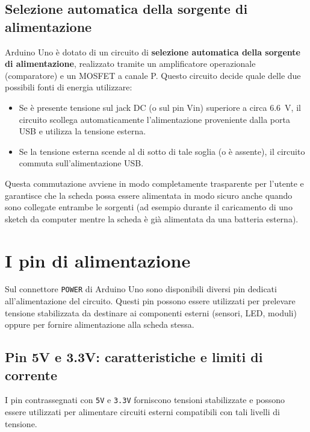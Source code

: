 \subsection*{Selezione automatica della sorgente di alimentazione}

Arduino Uno è dotato di un circuito di \textbf{selezione automatica della sorgente di alimentazione}, realizzato tramite un amplificatore operazionale (comparatore) e un MOSFET a canale P. Questo circuito decide quale delle due possibili fonti di energia utilizzare:

\begin{itemize}
    \item Se è presente tensione sul jack DC (o sul pin Vin) superiore a circa \SI{6.6}{\volt}, il circuito scollega automaticamente l'alimentazione proveniente dalla porta USB e utilizza la tensione esterna.
    \item Se la tensione esterna scende al di sotto di tale soglia (o è assente), il circuito commuta sull'alimentazione USB.
\end{itemize}

Questa commutazione avviene in modo completamente trasparente per l'utente e garantisce che la scheda possa essere alimentata in modo sicuro anche quando sono collegate entrambe le sorgenti (ad esempio durante il caricamento di uno sketch da computer mentre la scheda è già alimentata da una batteria esterna).

\section{I pin di alimentazione}

Sul connettore \texttt{POWER} di Arduino Uno sono disponibili diversi pin dedicati all'alimentazione del circuito. Questi pin possono essere utilizzati per prelevare tensione stabilizzata da destinare ai componenti esterni (sensori, LED, moduli) oppure per fornire alimentazione alla scheda stessa.

\subsection*{Pin 5V e 3.3V: caratteristiche e limiti di corrente}

I pin contrassegnati con \texttt{5V} e \texttt{3.3V} forniscono tensioni stabilizzate e possono essere utilizzati per alimentare circuiti esterni compatibili con tali livelli di tensione.

